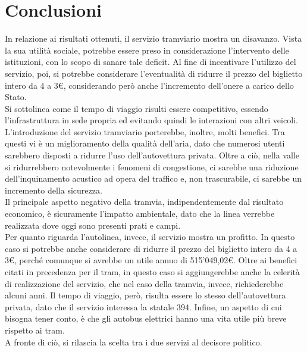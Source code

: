 \documentclass{article}
\begin{document}
\section{Conclusioni}
In relazione ai risultati ottenuti, il servizio tramviario mostra un disavanzo. Vista la sua utilità sociale, potrebbe essere preso in considerazione l'intervento delle istituzioni, con lo scopo di sanare tale deficit. Al fine di incentivare l'utilizzo del servizio, poi, si potrebbe considerare l'eventualità di ridurre il prezzo del biglietto intero da 4 a 3\euro, considerando però anche l'incremento dell'onere a carico dello Stato.\\
Si sottolinea come il tempo di viaggio risulti essere competitivo, essendo l'infrastruttura in sede propria ed evitando quindi le interazioni con altri veicoli. L'introduzione del servizio tramviario porterebbe, inoltre, molti benefici. Tra questi vi è un miglioramento della qualità dell'aria, dato che numerosi utenti sarebbero disposti a ridurre l'uso dell'autovettura privata. Oltre a ciò, nella valle si ridurrebbero notevolmente i fenomeni di congestione, ci sarebbe una riduzione dell'inquinamento acustico ad opera del traffico e, non trascurabile, ci sarebbe un incremento della sicurezza.\\
Il principale aspetto negativo della tramvia, indipendentemente dal risultato economico, è sicuramente l'impatto ambientale, dato che la linea verrebbe realizzata dove oggi sono presenti prati e campi.\\
Per quanto riguarda l'autolinea, invece, il servizio mostra un profitto. In questo caso si potrebbe anche considerare di ridurre il prezzo del biglietto intero da 4 a 3\euro, perché comunque si avrebbe un utile annuo di 515'049,02\euro. 
Oltre ai benefici citati in precedenza per il tram, in questo caso si aggiungerebbe anche la celerità di realizzazione del servizio, che nel caso della tramvia, invece, richiederebbe alcuni anni. Il tempo di viaggio, però, risulta essere lo stesso dell'autovettura privata, dato che il servizio interessa la statale 394. Infine, un aspetto di cui bisogna tener conto, è che gli autobus elettrici hanno una vita utile più breve rispetto ai tram.\\
A fronte di ciò, si rilascia la scelta tra i due servizi al decisore politico.
\newpage
\end{document}
